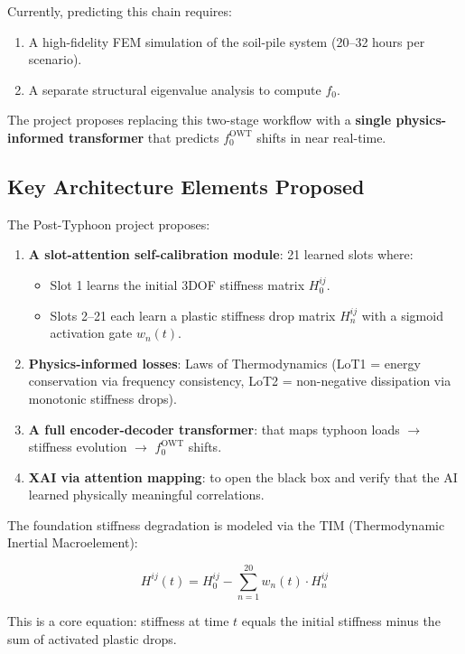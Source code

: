 \documentclass[11pt,a4paper]{article}
\begin{document}
Currently, predicting this chain requires:
\begin{enumerate}[nosep]
    \item A high-fidelity FEM simulation of the soil-pile system (20--32 hours per scenario).
    \item A separate structural eigenvalue analysis to compute $f_0$.
\end{enumerate}

The project proposes replacing this two-stage workflow with a \textbf{single physics-informed transformer} that predicts $f_0^{\text{OWT}}$ shifts in near real-time.

\subsection{Key Architecture Elements Proposed}

The Post-Typhoon project proposes:

\begin{enumerate}[nosep]
    \item \textbf{A slot-attention self-calibration module}: 21 learned slots where:
    \begin{itemize}[nosep]
        \item Slot 1 learns the initial 3DOF stiffness matrix $H_0^{ij}$.
        \item Slots 2--21 each learn a plastic stiffness drop matrix $H_n^{ij}$ with a sigmoid activation gate $w_n(t)$.
    \end{itemize}
    \item \textbf{Physics-informed losses}: Laws of Thermodynamics (LoT1 = energy conservation via frequency consistency, LoT2 = non-negative dissipation via monotonic stiffness drops).
    \item \textbf{A full encoder-decoder transformer}: that maps typhoon loads $\rightarrow$ stiffness evolution $\rightarrow$ $f_0^{\text{OWT}}$ shifts.
    \item \textbf{XAI via attention mapping}: to open the black box and verify that the AI learned physically meaningful correlations.
\end{enumerate}

The foundation stiffness degradation is modeled via the TIM (Thermodynamic Inertial Macroelement):

$$H^{ij}(t) = H_0^{ij} - \sum_{n=1}^{20} w_n(t) \cdot H_n^{ij}$$

This is a core equation: stiffness at time $t$ equals the initial stiffness minus the sum of activated plastic drops.
\end{document}
